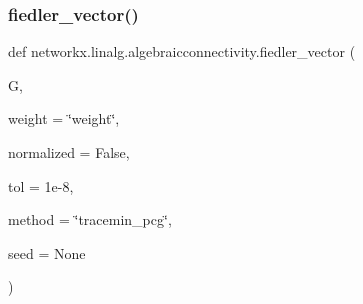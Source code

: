 \subsubsection{\texorpdfstring{fiedler\+\_\+vector()}{fiedler\_vector()}}
{\footnotesize\ttfamily def networkx.\+linalg.\+algebraicconnectivity.\+fiedler\+\_\+vector (\begin{DoxyParamCaption}\item[{}]{G,  }\item[{}]{weight = {\ttfamily \char`\"{}weight\char`\"{}},  }\item[{}]{normalized = {\ttfamily False},  }\item[{}]{tol = {\ttfamily 1e-\/8},  }\item[{}]{method = {\ttfamily \char`\"{}tracemin\+\_\+pcg\char`\"{}},  }\item[{}]{seed = {\ttfamily None} }\end{DoxyParamCaption})}

